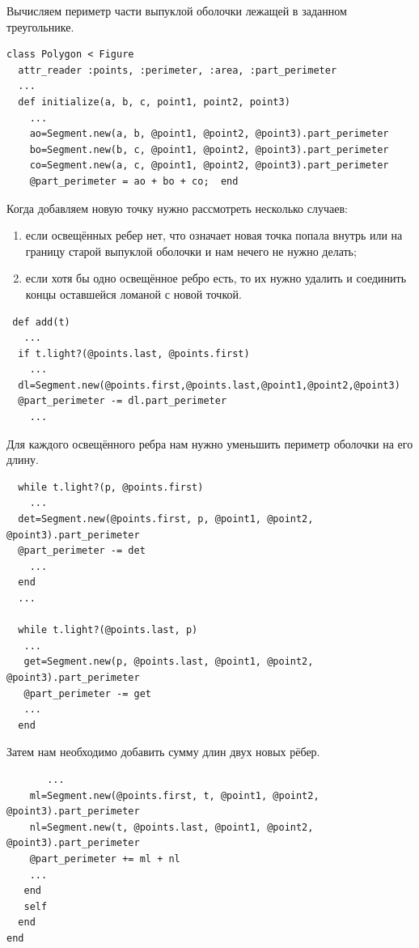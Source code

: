Вычисляем периметр части выпуклой оболочки лежащей в заданном треугольнике.
\begin{small}
\begin{verbatim}
class Polygon < Figure
  attr_reader :points, :perimeter, :area, :part_perimeter
  ...
  def initialize(a, b, c, point1, point2, point3) 
    ...
    ao=Segment.new(a, b, @point1, @point2, @point3).part_perimeter
    bo=Segment.new(b, c, @point1, @point2, @point3).part_perimeter
    co=Segment.new(a, c, @point1, @point2, @point3).part_perimeter
    @part_perimeter = ao + bo + co;  end
\end{verbatim}
\end{small}	  
Когда добавляем новую точку нужно рассмотреть несколько случаев:
\begin{enumerate}
\item если освещённых ребер нет, что означает новая точка попала внутрь или 
  на границу старой выпуклой оболочки и нам нечего не нужно делать;
\item если хотя бы одно освещённое ребро есть, то их нужно удалить и соединить концы оставшейся ломаной с новой точкой.
\end{enumerate}
\begin{small}
\begin{verbatim}
 def add(t)
   ...
  if t.light?(@points.last, @points.first)
    ...
  dl=Segment.new(@points.first,@points.last,@point1,@point2,@point3)
  @part_perimeter -= dl.part_perimeter
    ...
\end{verbatim}
\end{small}	
Для каждого освещённого ребра нам нужно уменьшить периметр оболочки на его длину.
\begin{small}
\begin{verbatim}
  while t.light?(p, @points.first)
    ...
  det=Segment.new(@points.first, p, @point1, @point2, @point3).part_perimeter
  @part_perimeter -= det
    ...
  end
  ...

  while t.light?(@points.last, p)
   ...
   get=Segment.new(p, @points.last, @point1, @point2, @point3).part_perimeter
   @part_perimeter -= get
   ...
  end
\end{verbatim}
\end{small} 
Затем нам необходимо добавить сумму длин двух новых рёбер.
\begin{small}
\begin{verbatim}
       ... 
    ml=Segment.new(@points.first, t, @point1, @point2, @point3).part_perimeter
    nl=Segment.new(t, @points.last, @point1, @point2, @point3).part_perimeter
    @part_perimeter += ml + nl
    ...
   end
   self
  end
end
\end{verbatim}
\end{small}

